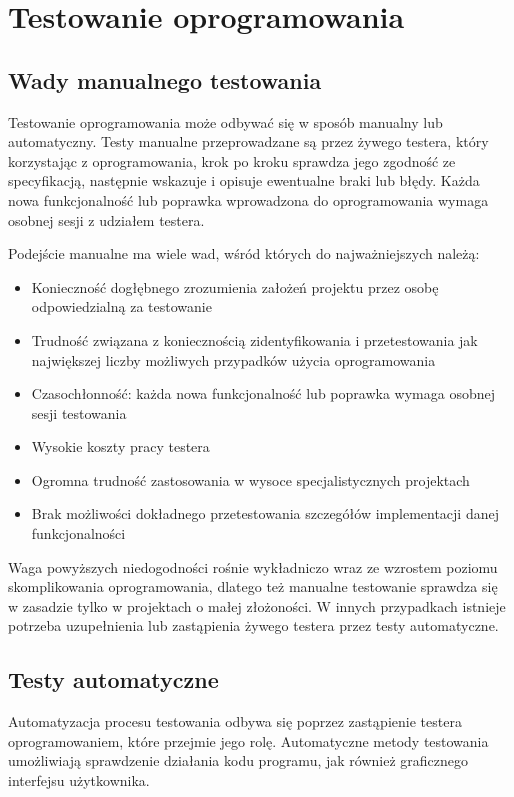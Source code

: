 	\section{Testowanie oprogramowania}
	  \subsection{Wady manualnego testowania}
  	  Testowanie oprogramowania może odbywać się w sposób manualny lub automatyczny. Testy manualne przeprowadzane są przez żywego testera, który korzystając z oprogramowania, krok po kroku sprawdza jego zgodność ze specyfikacją, następnie wskazuje i opisuje ewentualne braki lub błędy. Każda nowa funkcjonalność lub poprawka wprowadzona do oprogramowania wymaga osobnej sesji z udziałem testera. 
	  
  	  Podejście manualne ma wiele wad, wśród których do najważniejszych należą:
	  
  	  \begin{itemize}
  	    \item Konieczność dogłębnego zrozumienia założeń projektu przez osobę odpowiedzialną za testowanie
  	    \item Trudność związana z koniecznością zidentyfikowania i przetestowania jak największej liczby możliwych przypadków użycia oprogramowania
  	    \item Czasochłonność: każda nowa funkcjonalność lub poprawka wymaga osobnej sesji testowania
  	   	\item Wysokie koszty pracy testera
  	   	\item Ogromna trudność zastosowania w wysoce specjalistycznych projektach
  	   	\item Brak możliwości dokładnego przetestowania szczegółów implementacji danej funkcjonalności
  	  \end{itemize}
	  
  	  Waga powyższych niedogodności rośnie wykładniczo wraz ze wzrostem poziomu skomplikowania oprogramowania, dlatego też manualne testowanie sprawdza się w zasadzie tylko w projektach o małej złożoności. W innych przypadkach istnieje potrzeba uzupełnienia lub zastąpienia żywego testera przez testy automatyczne.
	  
	  \subsection{Testy automatyczne}
	    Automatyzacja procesu testowania odbywa się poprzez zastąpienie testera oprogramowaniem, które przejmie jego rolę. Automatyczne metody testowania umożliwiają sprawdzenie działania kodu programu, jak również graficznego interfejsu użytkownika.
